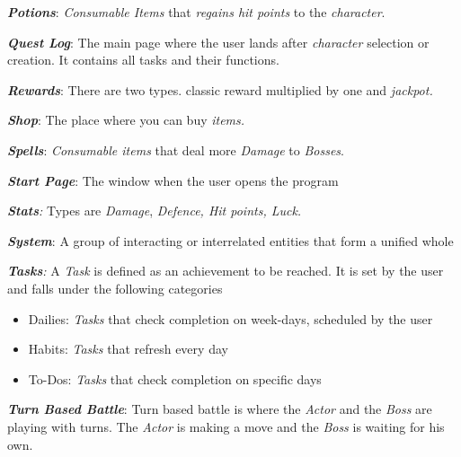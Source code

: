 \documentclass[12pt]{report}
\renewcommand{\_}{\kern-1.5pt\textunderscore\kern-1.5pt}
\begin{document}
\textbf{\textit{Potions}}: \textit{Consumable Items} that \textit{regains hit points }to the \textit{character}.\par

\textbf{\textit{Quest Log}}: The main page where the user lands after \textit{character} selection or creation. It contains all tasks and their functions.\par

\textbf{\textit{Rewards}}: There are two types. classic reward multiplied by one and \textit{jackpot.}\par

\textbf{\textit{Shop}}: The place where you can buy\textit{ items.}\par

\textbf{\textit{Spells}}: \textit{Consumable items} that deal more \textit{Damage} to \textit{Bosses}.\par

\textbf{\textit{Start Page}}: The window when the user opens the program\par

\textbf{\textit{Stats}}\textit{: }Types are \textit{Damage}, \textit{Defence, Hit points, Luck.}\par

\textbf{\textit{System}}: \textcolor[HTML]{222222}{A group of interacting or interrelated entities that form a unified whole}\par

\textbf{\textit{Tasks}}\textit{:} A \textit{Task }is defined as an achievement to be reached. It is set by the user and falls under the following categories\par

\begin{itemize}
	\item Dailies: \textit{Tasks }that check completion on week-days, scheduled by the user\par

	\item Habits: \textit{Tasks }that refresh every day\par

	\item To-Dos: \textit{Tasks }that check completion on specific days
\end{itemize}\par

\textbf{\textit{Turn Based Battle}}: Turn based battle is where the \textit{Actor} and the \textit{Boss} are playing with turns. The \textit{Actor} is making a move and the \textit{Boss} is waiting for his own.\par
\end{document}

